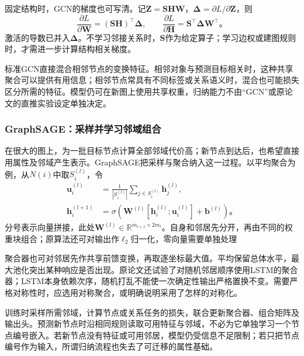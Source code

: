 固定结构时，GCN的梯度也可写清。记$\bm{Z}=\bm{S}\bm{H}\bm{W}$，$\bm{\Delta}=\partial L/\partial\bm{Z}$，则
\begin{equation}
  \frac{\partial L}{\partial\bm{W}}=(\bm{S}\bm{H})^{\top}\bm{\Delta},\qquad
  \frac{\partial L}{\partial\bm{H}}=\bm{S}^{\top}\bm{\Delta}\bm{W}^{\top}\text{。}
  \label{eq:gnn-gcn-backprop}
\end{equation}
激活的导数已并入$\bm{\Delta}$。不学习邻接关系时，$\bm{S}$作为给定算子；学习边权或建图规则时，才需进一步计算结构相关梯度。

标准GCN直接混合相邻节点的变换特征。相邻对象与预测目标相关时，这种共享聚合可以提供有用信息；相邻节点常具有不同标签或关系语义时，混合也可能损失区分所需的特征。模型仍可在新图上使用共享权重，归纳能力不由“GCN”或原论文的直推实验设定单独决定。

\subsubsection{GraphSAGE：采样并学习邻域组合}
\label{sec:gnn-graphsage}

在很大的图上，为一批目标节点计算全部邻域代价高；新节点到达后，也希望直接用属性及邻域产生表示。GraphSAGE把采样与聚合纳入这一过程。以平均聚合为例，从$N(i)$中取$S_i^{(l)}$，令
\begin{equation}
  \begin{aligned}
    \bm{u}_i^{(l)}&=\frac{1}{|S_i^{(l)}|}\sum_{j\in S_i^{(l)}}\bm{h}_j^{(l)},\\
    \bm{h}_i^{(l+1)}&=\sigma\!\left(
      \bm{W}^{(l)}[\bm{h}_i^{(l)};\bm{u}_i^{(l)}]+\bm{b}^{(l)}\right)\text{。}
  \end{aligned}
  \label{eq:gnn-graphsage}
\end{equation}
分号表示向量拼接，此处$\bm{W}^{(l)}\in\mathbb{R}^{m_{l+1}\times2m_l}$。自身和邻居先分开，再由不同的权重块组合；原算法还可对输出作$\ell_2$归一化，零向量需要单独处理

聚合器也可对邻居先作共享前馈变换，再取逐坐标最大值。平均保留总体水平，最大池化突出某种响应是否出现。原论文还试验了对随机邻居顺序使用LSTM的聚合器；LSTM本身依赖次序，随机打乱不能使一次确定性输出严格置换不变。需要严格对称性时，应选用对称聚合，或明确说明采用了怎样的对称化。

训练时采样所需邻域，计算节点或关系任务的损失，联合更新聚合器、组合矩阵及输出头。预测新节点时沿相同规则读取可用特征与邻域，不必为它单独学习一个节点编号嵌入。若新节点没有特征或可用邻居，模型仍受信息不足限制；若只把节点编号作为输入，所谓归纳流程也失去了可迁移的属性基础。

